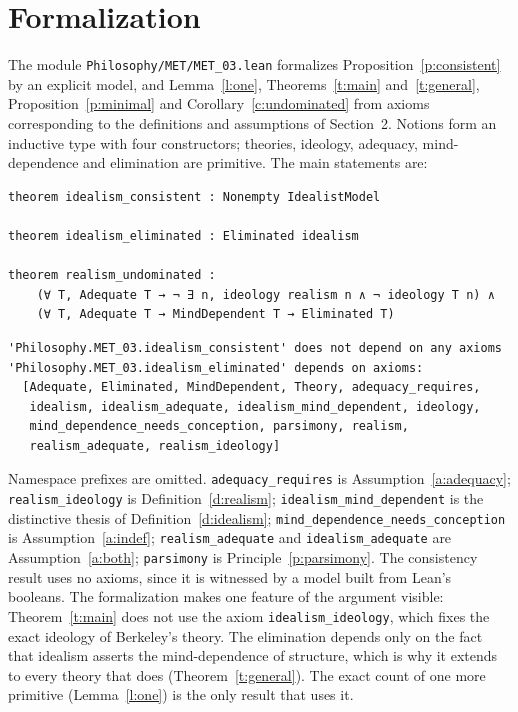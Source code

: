 \documentclass{situationist-preprint}
\begin{document}
\section{Formalization}

The module \nolinkurl{Philosophy/MET/MET_03.lean} formalizes Proposition~\ref{p:consistent} by an explicit model, and Lemma~\ref{l:one}, Theorems~\ref{t:main} and~\ref{t:general}, Proposition~\ref{p:minimal} and Corollary~\ref{c:undominated} from axioms corresponding to the definitions and assumptions of Section~2. Notions form an inductive type with four constructors; theories, ideology, adequacy, mind-dependence and elimination are primitive. The main statements are:

\begin{lstlisting}
theorem idealism_consistent : Nonempty IdealistModel

theorem idealism_eliminated : Eliminated idealism

theorem realism_undominated :
    (∀ T, Adequate T → ¬ ∃ n, ideology realism n ∧ ¬ ideology T n) ∧
    (∀ T, Adequate T → MindDependent T → Eliminated T)
\end{lstlisting}

\begin{lstlisting}
'Philosophy.MET_03.idealism_consistent' does not depend on any axioms
'Philosophy.MET_03.idealism_eliminated' depends on axioms:
  [Adequate, Eliminated, MindDependent, Theory, adequacy_requires,
   idealism, idealism_adequate, idealism_mind_dependent, ideology,
   mind_dependence_needs_conception, parsimony, realism,
   realism_adequate, realism_ideology]
\end{lstlisting}

\begin{sloppypar}
Namespace prefixes are omitted. \texttt{adequacy\_requires} is Assumption~\ref{a:adequacy}; \texttt{realism\_ideology} is Definition~\ref{d:realism}; \texttt{idealism\_mind\_dependent} is the distinctive thesis of Definition~\ref{d:idealism}; \texttt{mind\_dependence\_needs\_conception} is Assumption~\ref{a:indef}; \texttt{realism\_adequate} and \texttt{idealism\_adequate} are Assumption~\ref{a:both}; \texttt{parsimony} is Principle~\ref{p:parsimony}. The consistency result uses no axioms, since it is witnessed by a model built from Lean's booleans. The formalization makes one feature of the argument visible: Theorem~\ref{t:main} does not use the axiom \texttt{idealism\_ideology}, which fixes the exact ideology of Berkeley's theory. The elimination depends only on the fact that idealism asserts the mind-dependence of structure, which is why it extends to every theory that does (Theorem~\ref{t:general}). The exact count of one more primitive (Lemma~\ref{l:one}) is the only result that uses it.
\end{sloppypar}
\end{document}

